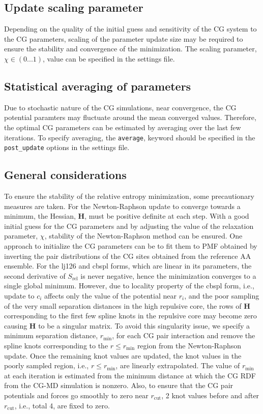 \subsection{Update scaling parameter}
Depending on the quality of the initial guess and sensitivity of the CG system
to the CG parameters, scaling of the parameter update size may be required to
ensure the stability and convergence of the \re minimization. The scaling
parameter, $\chi\in(0...1)$, value can be specified in the \xml settings file.

\subsection{Statistical averaging of parameters}
Due to stochastic nature of the CG simulations, near convergence, the CG
potential paramters may fluctuate around the mean converged values. Therefore,
the optimal CG parameters can be estimated by averaging over the last few
iterations. To specify averaging, the \texttt{average}, keyword should be
specified in the \texttt{post\_update} options in the \xml settings file.

\subsection{General considerations}
To ensure the stability of the relative entropy minimization, some precautionary
measures are taken. For the Newton-Raphson update to converge towards a minimum,
the Hessian, $\mathbf{H}$, must be positive definite at each step. With a good
initial guess for the CG parameters and by adjusting the value of the relaxation
parameter, $\chi$, stability of the Newton-Raphson method can be ensured. One
approach to initialize the CG parameters can be to fit them to PMF obtained by
inverting the pair distributions of the CG sites obtained from the reference AA
ensemble. For the lj126 and cbspl forms, which are linear in its parameters, the
second derivative of $S_{\text{rel}}$ is never negative, hence the minimization
converges to a single global minimum. However, due to locality property of the
cbspl form, i.e., update to $c_i$ affects only the value of the potential near
$r_i$, and the poor sampling of the very small separation distances in the high
repulsive core, the rows of $\mathbf{H}$ corresponding to the first few spline
knots in the repulsive core may become zero causing $\mathbf{H}$ to be a
singular matrix. To avoid this singularity issue, we specify a minimum
separation distance, $r_{\text{min}}$, for each CG pair interaction and remove
the spline knots corresponding to the $r\le r_{\text{min}}$ region from the
Newton-Raphson update. Once the remaining knot values are updated, the knot
values in the poorly sampled region, i.e., $r\le r_{\text{min}}$, are linearly
extrapolated. The value of $r_{\text{min}}$ at each iteration is estimated from
the minimum distance at which the CG RDF from the CG-MD simulation is
nonzero. Also, to ensure that the CG pair potentials and forces go smoothly to
zero near $r_{\text{cut}}$, 2 knot values before and after $r_{\text{cut}}$,
i.e., total 4, are fixed to zero.


